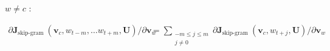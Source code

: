 \documentclass{article}
\begin{document}
$w \neq c$ :

\begin{equation*}
  \begin{aligned}
    \partial \boldsymbol{J}_{\text {skip-gram }}\left(\boldsymbol{v}_{c}, w_{t-m}, \ldots w_{t+m}, \boldsymbol{U}\right) / \partial \boldsymbol{v}_w &= \sum_{\substack{-m \leq j \leq m \\ j \neq 0}} \partial \boldsymbol{J}_{\text {skip-gram }}\left(\boldsymbol{v}_{c}, w_{t+j}, \boldsymbol{U}\right) / \partial \boldsymbol{v}_w
  \end{aligned}
\end{equation*}
\end{document}
